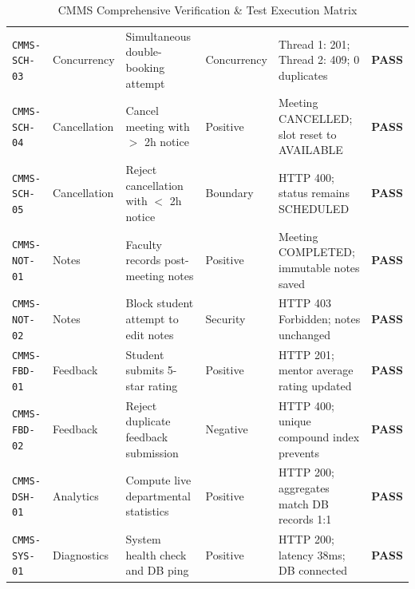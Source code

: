 \documentclass[11pt,a4paper]{article}
\begin{document}
\begin{table}[H]
\begin{tabularx}{\textwidth}{p{1.9cm}p{1.7cm}Xp{1.5cm}p{3.2cm}c}
\texttt{CMMS-SCH-03}  & Concurrency & Simultaneous double-booking attempt & Concurrency & Thread 1: 201; Thread 2: 409; 0 duplicates & \textbf{\color{successgreen}PASS} \\
\texttt{CMMS-SCH-04}  & Cancellation & Cancel meeting with $>$ 2h notice & Positive & Meeting CANCELLED; slot reset to AVAILABLE & \textbf{\color{successgreen}PASS} \\
\texttt{CMMS-SCH-05}  & Cancellation & Reject cancellation with $<$ 2h notice & Boundary & HTTP 400; status remains SCHEDULED & \textbf{\color{successgreen}PASS} \\
\texttt{CMMS-NOT-01}  & Notes & Faculty records post-meeting notes & Positive & Meeting COMPLETED; immutable notes saved & \textbf{\color{successgreen}PASS} \\
\texttt{CMMS-NOT-02}  & Notes & Block student attempt to edit notes & Security & HTTP 403 Forbidden; notes unchanged & \textbf{\color{successgreen}PASS} \\
\texttt{CMMS-FBD-01}  & Feedback & Student submits 5-star rating & Positive & HTTP 201; mentor average rating updated & \textbf{\color{successgreen}PASS} \\
\texttt{CMMS-FBD-02}  & Feedback & Reject duplicate feedback submission & Negative & HTTP 400; unique compound index prevents & \textbf{\color{successgreen}PASS} \\
\texttt{CMMS-DSH-01}  & Analytics & Compute live departmental statistics & Positive & HTTP 200; aggregates match DB records 1:1 & \textbf{\color{successgreen}PASS} \\
\texttt{CMMS-SYS-01}  & Diagnostics & System health check and DB ping & Positive & HTTP 200; latency 38ms; DB connected & \textbf{\color{successgreen}PASS} \\
\bottomrule
\end{tabularx}
\caption{CMMS Comprehensive Verification \& Test Execution Matrix}
\label{tab:test_matrix}
\end{table}
\end{document}
